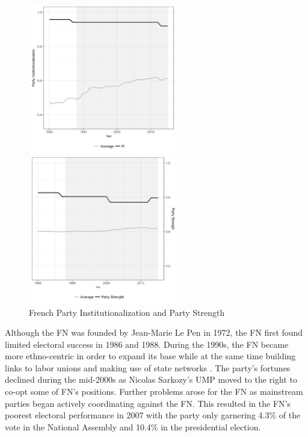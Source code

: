 \documentclass[a4paper,12pt]{article}\usepackage[]{graphicx}\usepackage[]{color}
\begin{document}
\begin{figure}[H]%
\centering
\parbox{2.5in}{\includegraphics[width=65mm, height=65mm]{france1.jpg}}%
\qquad
\begin{minipage}{2in}%
\includegraphics[width=65mm, height=65mm]{france2.jpg}
\end{minipage}%
\caption{French Party Institutionalization and Party Strength}%
\label{francepsi}%
\end{figure}
\par
Although the FN was founded by Jean-Marie Le Pen in 1972, the FN first found limited electoral success in 1986 and 1988. During the 1990s, the FN became more ethno-centric in order to expand its base while at the same time building links to labor unions and making use of state networks \citep{schain1999national}. The party's fortunes declined during the mid-2000s as Nicolas Sarkozy's UMP moved to the right to co-opt some of FN's positions. Further problems  arose for the FN as mainstream parties began actively coordinating against the FN. This resulted in the FN's poorest electoral performance in 2007 with the party only garnering 4.3\% of the vote in the National Assembly and 10.4\% in the presidential election. 
\par
\end{document}
